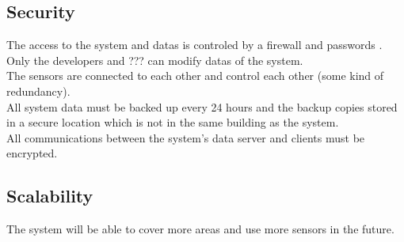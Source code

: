 \subsection{Security}
The access to the system and datas is controled by a firewall and passwords .\\
Only the developers and ??? can modify datas of the system.\\
The sensors are connected to each other and control each other (some kind of redundancy).\\
All system data must be backed up every 24 hours and the backup copies stored in a secure location which is not in the same building as the system.\\
All communications between the system’s data server and clients must be encrypted.\\

\subsection{Scalability}
The system will be able to cover more areas and use more sensors in the future.


